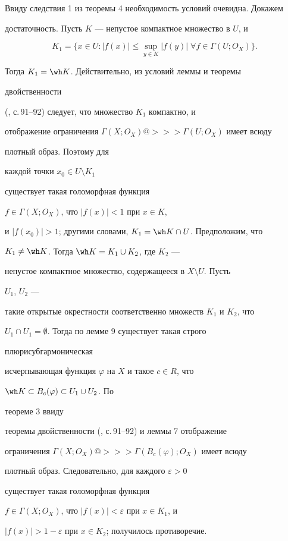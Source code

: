 \begin{pf} 


Ввиду следствия 1 из теоремы 4 необходимость условий очевидна. Докажем 


достаточность. Пусть $K$ --- непустое компактное множество в $U$, и 


$$ 


K_1=\{x\in U:|f(x)|\le\sup_{y\in K}|f(y)|\; 


\forall f\in\Gamma(U;O_X)\}. 


$$ 


Тогда $K_1=\wh K$. Действительно, из условий леммы и теоремы 


двойственности 


(\cite{1}, с.\,91--92) следует, что множество $K_1$ компактно, и 


отображение ограничения $\Gamma(X;O_X)@>>>\Gamma(U;O_X)$ имеет всюду 


плотный образ. Поэтому для 


каждой точки $x_0\in U\setminus K_1$ 


существует такая голоморфная функция 


$f\in\Gamma(X;O_X)$, что $|f(x)|<1$ при $x\in K$, 


и $|f(x_0)|>1$; другими словами, $K_1=\wh K\cap U$. Предположим, что 


$K_1\ne\wh K$. Тогда $\wh K=K_1\cup K_2$, где $K_2$ --- 


непустое компактное множество, содержащееся в $X\setminus U$. Пусть 


$U_1$, $U_2$ --- 


такие открытые окрестности соответственно множеств $K_1$ и $K_2$, что 


$U_1\cap U_1=\emptyset$. Тогда по лемме 9 существует такая строго 


плюрисубгармоническая 


исчерпывающая функция $\varphi$ на $X$ и такое $c\in R$, что 


$\wh K\subset B_c(\varphi)\subset U_1\cup U_2$. По 


теореме 3 ввиду 


теоремы двойственности (\cite{1}, с.\,91--92) и леммы 7 отображение 


ограничения $\Gamma(X;O_X)@>>>\Gamma(B_c(\varphi);O_X)$ имеет всюду 


плотный образ. Следовательно, для каждого $\varepsilon>0$ 


существует такая голоморфная функция 


$f\in\Gamma(X;O_X)$, что $|f(x)|<\varepsilon$ при $x\in K_1$, и 


$|f(x)|>1-\varepsilon$ при $x\in K_2$; получилось противоречие. 


\end{pf} 



